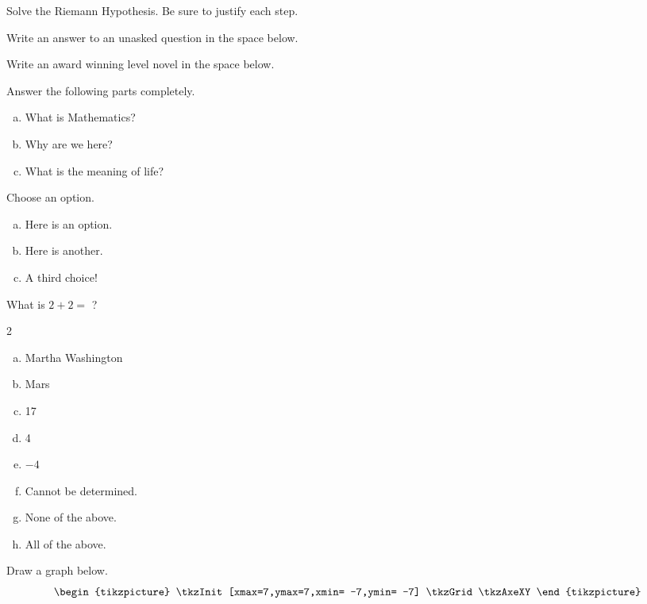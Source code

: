 \documentclass[12pt,letterpaper]{article}	%
\begin{document}
\newpage
\problem Solve the Riemann Hypothesis. Be sure to justify each step.



\newpage
\problem Write an answer to an unasked question in the space below. \pspace
\emptybox{2in}



\newpage
\problem Write an award winning level novel in the space below. \pspace
\emptybox{8in}



\newpage
\problem Answer the following parts completely. \vspace{0.5cm}
	\begin{enumerate}[(a)]
	\item What is Mathematics? \vspace{2cm}
	\item Why are we here? \vfill
	\item What is the meaning of life? \vfill
	\end{enumerate}



\newpage
\problem Choose an option.
	\begin{enumerate}[(a)]
	\item Here is an option.
	\item Here is another.
	\item A third choice!
	\end{enumerate}



\newpage
{%
\problem What is $2+2=$ ?
	\begin{multicols}{2}
	\begin{enumerate}[(a)]
	\item Martha Washington
	\item Mars
	\item 17
	\item 4
	\item $-4$
	\item Cannot be determined.
	\item None of the above.
	\item All of the above.
	\end{enumerate}
	\end{multicols}
}%



\newpage
\problem Draw a graph below. 
	\[
	\begin{tikzpicture}
	\tkzInit[xmax=7,ymax=7,xmin= -7,ymin= -7]
   	\tkzGrid
   	\tkzAxeXY
  	\end{tikzpicture}
	\]
\end{document}
